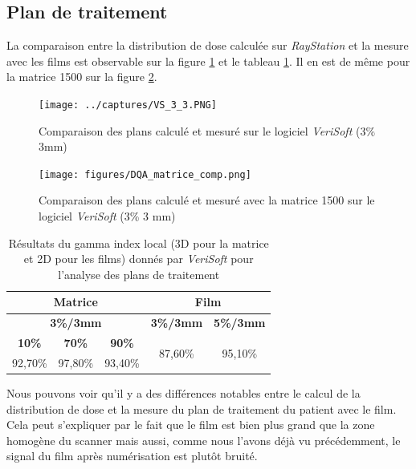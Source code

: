 \documentclass{book}
\begin{document}
\subsection{Plan de traitement}

La comparaison entre la distribution de dose calculée sur \textit{RayStation} et la mesure avec les films est observable sur la figure \ref*{fig_dose_map_VS} et le tableau \ref*{table_gamma_index}. Il en est de même pour la matrice 1500 sur la figure \ref*{fig_dose_map_matrice}.

\begin{figure}[h]
  \centering
  \texttt{[image: ../captures/VS\_3\_3.PNG]}
  \caption{Comparaison des plans calculé et mesuré sur le logiciel \textit{VeriSoft} (3\% 3mm)}
  \label{fig_dose_map_VS}
\end{figure}

\begin{figure}[h]
  \centering
  \texttt{[image: figures/DQA\_matrice\_comp.png]}
  \caption{Comparaison des plans calculé et mesuré avec la matrice 1500 sur le logiciel \textit{VeriSoft} (3\% 3 mm)}
  \label{fig_dose_map_matrice}
\end{figure}

\begin{table}[h]
  \centering
  \begin{tabular}{|ccc|cc|}
  \hline
  \multicolumn{3}{|c|}{\textbf{Matrice}}                                 & \multicolumn{2}{c|}{\textbf{Film}}                       \\ \hline
  \multicolumn{3}{|c|}{\textbf{3\%/3mm}}                                 & \multicolumn{1}{c|}{\textbf{3\%/3mm}} & \textbf{5\%/3mm} \\ \hline
  \multicolumn{1}{|c|}{\textbf{10\%}} & \multicolumn{1}{c|}{\textbf{70\%}} & \textbf{90\%} & \multicolumn{1}{c|}{\multirow{2}{*}{87,60\%}} & \multirow{2}{*}{95,10\%} \\ \cline{1-3}
  \multicolumn{1}{|c|}{92,70\%} & \multicolumn{1}{c|}{97,80\%} & 93,40\% & \multicolumn{1}{c|}{}                 &                  \\ \hline
  \end{tabular}
  \caption{Résultats du gamma index local (3D pour la matrice et 2D pour les films) donnés par \textit{VeriSoft} pour l'analyse des plans de traitement}
  \label{table_gamma_index}
  \end{table}

Nous pouvons voir qu'il y a des différences notables entre le calcul de la distribution de dose et la mesure du plan de traitement du patient avec le film. Cela peut s'expliquer par le fait que le film est bien plus grand que la zone homogène du scanner mais aussi, comme nous l'avons déjà vu précédemment, le signal du film après numérisation est plutôt bruité.
\end{document}
